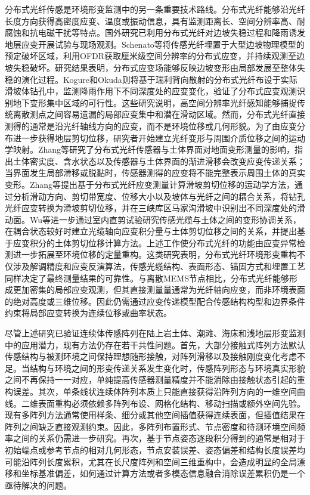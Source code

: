 分布式光纤传感是环境形变监测中的另一条重要技术路线。分布式光纤能够沿光纤长度方向获得高密度应变、温度或振动信息，具有监测距离长、空间分辨率高、耐腐蚀和抗电磁干扰等特点\cite{coscetta2025distributed}。国外研究已利用分布式光纤对边坡失稳过程和降雨诱发地层应变开展试验与现场观测。Schenato等将传感光纤埋置于大型边坡物理模型的预定破坏区域，利用OFDR获取厘米级空间分辨率的分布式应变，并持续观测至边坡失稳破坏\cite{schenato2017landslide}。研究结果表明，分布式应变场能够反映边坡变形由局部发展至整体失稳的演化过程。Kogure和Okuda则将基于瑞利背向散射的分布式光纤布设于实际滑坡体钻孔中，监测降雨作用下不同深度处的应变变化，验证了分布式应变观测识别地下变形集中区域的可行性\cite{kogure2018rainfall}。这些研究说明，高空间分辨率光纤感知能够捕捉传统离散测点之间容易遗漏的局部应变集中和潜在滑动区域。然而，分布式光纤直接测得的通常是沿光纤轴线方向的应变，而不是环境位移或几何形貌。为了由应变分布进一步获得地层剪切位移，研究者开始建立光纤变形与周围介质位移之间的运动学映射。Zhang等研究了分布式光纤传感器与土体界面对地面变形测量的影响，指出土体密实度、含水状态以及传感器与土体界面的渐进滑移会改变应变传递关系；当界面发生局部滑移或脱黏时，传感器测得的应变将不能完整表示周围土体的真实变形\cite{zhang2016interface}。Zhang等提出基于分布式光纤应变测量计算滑坡剪切位移的运动学方法，通过分析滑动方向、剪切带宽度、位移大小以及坡体与光纤之间的耦合关系，将钻孔光纤应变转换为滑坡剪切位移，并在三峡库区马家沟滑坡中识别出不同深度处的滑动面\cite{zhang2018kinematic}。Wu等进一步通过室内直剪试验研究传感光缆与土体之间的变形协调关系，在耦合状态较好时建立光缆轴向应变积分量与土体剪切位移之间的关系，并提出基于应变积分的土体剪切位移计算方法\cite{wu2020strainintegration}。上述工作使分布式光纤的功能由应变异常检测进一步拓展至环境位移的定量重构。这类研究表明，分布式光纤环境形变重构不仅涉及解调精度和应变反演算法，传感光缆结构、表面形态、锚固方式和埋置工艺同样决定了最终测量结果的可靠性。与离散MEMS节点相比，分布式光纤能够形成更加密集的局部应变观测，但其直接测量量通常为光纤轴向应变，而非环境表面的绝对高度或三维位移。因此仍需通过应变传递模型配合传感结构构型和边界条件约束将局部应变转换为连续位移或曲率状态。

尽管上述研究已验证连续体传感阵列在陆上岩土体、潮滩、海床和浅地层形变监测中的应用潜力，现有方法仍存在若干共性问题。首先，大部分接触式阵列方法默认传感结构与被测环境之间保持理想随形接触，对阵列滑移以及接触刚度变化考虑不足。当结构与环境之间的形变传递关系发生变化时，传感阵列形态与环境真实形貌之间不再保持一一对应，单纯提高传感器测量精度并不能消除由接触状态引起的重构误差。其次，单条线状连续体阵列本质上只能直接获得沿阵列方向的一维空间曲线。二维表面重构必须依赖多阵列布设、网格化结构、移动扫描或额外空间先验。现有多阵列方法通常使用样条、细分或其他空间插值获得连续表面，但插值结果在阵列之间缺乏直接观测约束。因此，多阵列布置形式、节点密度和待测环境空间频率之间的关系仍需进一步研究。再次，基于节点姿态逐段积分得到的通常是相对于初始端点或参考节点的相对几何形态，节点安装误差、姿态偏差和结构长度误差均可能沿阵列长度累积，尤其在长尺度阵列和空间三维重构中，会造成明显的全局漂移和坐标基准偏差，如何通过计算方法或者多模态信息融合消除误差累积仍是一个亟待解决的问题。

